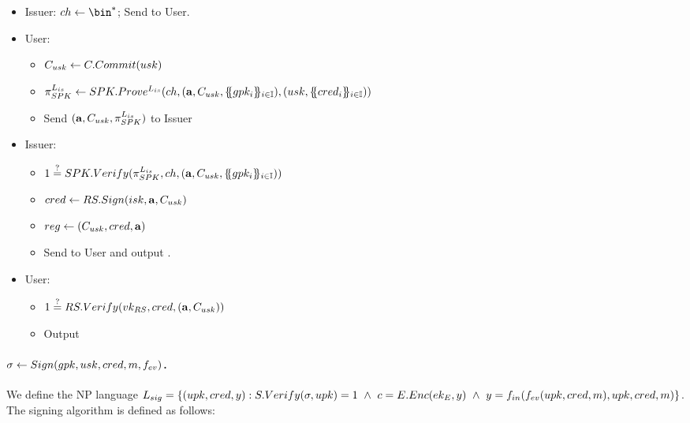 \begin{itemize}
\item Issuer: $\ch \gets \bin^*$; Send \ch to User.
\item User:
  \begin{itemize}    
  \item $C_{usk} \gets C.Commit(usk)$
  \item $\pi_{SPK}^{L_{is}} \gets SPK.Prove^{L_{is}}
    (ch,(\mathbf{a},C_{usk}, \{\mskip-5mu\{ gpk_i \}\mskip-5mu\}_{i \in \mathbb{I}}),
    (usk,\{\mskip-5mu\{ cred_i \}\mskip-5mu\}_{i \in \mathbb{I}}))$
  \item Send $(\mathbf{a},C_{usk},\pi_{SPK}^{L_{is}})$ to Issuer
  \end{itemize}
\item Issuer:
  \begin{itemize}
  \item $1 \stackrel{?}{=} SPK.Verify(\pi_{SPK}^{L_{is}},ch,
    (\mathbf{a},C_{usk}, \{\mskip-5mu\{ gpk_i \}\mskip-5mu\}_{i \in \mathbb{I}}))$
  \item $cred \gets RS.Sign(isk,\mathbf{a},C_{usk})$
  \item $reg \gets (C_{usk},cred,\mathbf{a})$
  \item Send \cred to User and output \utrans.
  \end{itemize}
\item User:
  \begin{itemize}
  \item $1 \stackrel{?}{=} RS.Verify(vk_{RS},cred,(\mathbf{a},C_{usk}))$
  \item Output \cred
  \end{itemize}   
\end{itemize}

\paragraph{$\sigma \gets Sign(gpk,usk,cred,m,f_{ev})$.} %
We define the NP language $L_{sig} = \lbrace (upk,cred,y):
S.Verify(\sigma,upk) = 1~\land~c = E.Enc(ek_{E},y)~\land~
y = f_{in}(f_{ev}(upk,cred,m),upk,cred,m)\rbrace$. The
signing algorithm is defined as follows:

